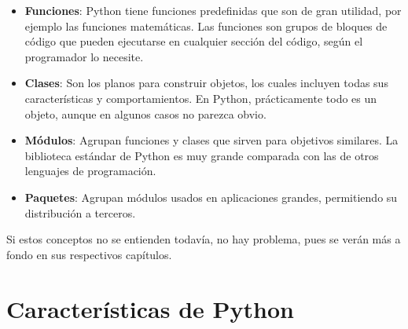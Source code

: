 \begin{itemize}
  \item \textbf{Funciones}: Python tiene funciones predefinidas que son de gran utilidad, por ejemplo las funciones matemáticas.
  Las funciones son grupos de bloques de código que pueden ejecutarse en cualquier sección del código, según el programador lo necesite.
  
  \item \textbf{Clases}: Son los planos para construir objetos, los cuales incluyen todas sus características y comportamientos.
  En Python, prácticamente todo es un objeto, aunque en algunos casos no parezca obvio.
  
  \item \textbf{Módulos}: Agrupan funciones y clases que sirven para objetivos similares.
  La biblioteca estándar de Python es muy grande comparada con las de otros lenguajes de programación.
  
  \item \textbf{Paquetes}: Agrupan módulos usados en aplicaciones grandes, permitiendo su distribución a terceros.
  
\end{itemize}

Si estos conceptos no se entienden todavía, no hay problema, pues se verán más a fondo en sus respectivos capítulos.

\section{Características de Python}

